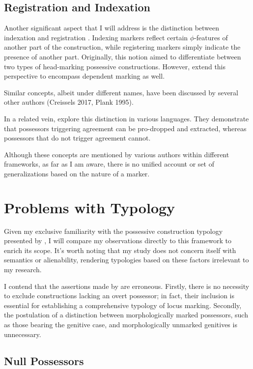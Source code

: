 \subsection{Registration and Indexation}

Another significant aspect that I will address is the distinction between indexation and registration \citep{nichols1992linguistic}. Indexing markers reflect certain $\phi$-features of another part of the construction, while registering markers simply indicate the presence of another part. Originally, this notion aimed to differentiate between two types of head-marking possessive constructions. However, \cite{lander2020head} extend this perspective to encompass dependent marking as well.

Similar concepts, albeit under different names, have been discussed by several other authors (Creissels 2017, Plank 1995).

In a related vein, \cite{duguine2008structural} explore this distinction in various languages. They demonstrate that possessors triggering agreement can be pro-dropped and extracted, whereas possessors that do not trigger agreement cannot.

Although these concepts are mentioned by various authors within different frameworks, as far as I am aware, there is no unified account or set of generalizations based on the nature of a marker.


\section{Problems with \cite{nichols_locus_2013} Typology}

Given my exclusive familiarity with the possessive construction typology presented by \cite{nichols_locus_2013}, I will compare my observations directly to this framework to enrich its scope. It's worth noting that my study does not concern itself with semantics or alienability, rendering typologies based on these factors irrelevant to my research.

I contend that the assertions made by \cite{nichols_locus_2013} are erroneous. Firstly, there is no necessity to exclude constructions lacking an overt possessor; in fact, their inclusion is essential for establishing a comprehensive typology of locus marking. Secondly, the postulation of a distinction between morphologically marked possessors, such as those bearing the genitive case, and morphologically unmarked genitives is unnecessary.

\subsection{Null Possessors}

